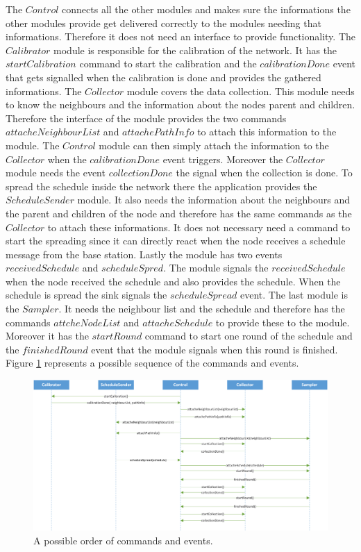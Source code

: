 The $Control$ connects all the other modules and makes sure the informations the other modules provide get delivered correctly to the modules needing that informations. Therefore it does not need an interface to provide functionality.     
The $Calibrator$ module is responsible for the calibration of the network. It has the $startCalibration$ command to start the calibration and the $calibrationDone$ event that gets signalled when the calibration is done and provides the gathered informations. The $Collector$ module covers the data collection. This module needs to know the neighbours and the information about the nodes parent and children. Therefore the interface of the module provides the two commands $attacheNeighbourList$ and $attachePathInfo$ to attach this information to the module. The $Control$ module can then simply attach the information to the $Collector$ when the $calibrationDone$ event triggers. Moreover the $Collector$ module needs the event $collectionDone$ the signal when the collection is done. To spread the schedule inside the network there the application provides the $ScheduleSender$ module. It also needs the information about the neighbours and the parent and children of the node and therefore has the same commands as the $Collector$ to attach these informations. It does not necessary need a command to start the spreading since it can directly react when the node receives a schedule message from the base station. Lastly the module has two events $receivedSchedule$ and $scheduleSpred$. The module signals the $receivedSchedule$ when the node received the schedule and also provides the schedule. When the schedule is spread the sink signals the $scheduleSpread$ event. The last module is the $Sampler$. It needs the neighbour list and the schedule and therefore has the commands $attcheNodeList$ and $attacheSchedule$ to provide these to the module. Moreover it has the $startRound$ command to start one round of the schedule and the $finishedRound$ event that the module signals when this round is finished. Figure \ref{fig:commandEvents} represents a possible sequence of the commands and events.

\begin{figure}[btp]
	\centering
    \includegraphics[scale=0.55]{content/images/Processes/ComandsEvents}
   	\caption{A possible order of commands and events.}
    \label{fig:commandEvents}
\end{figure}

